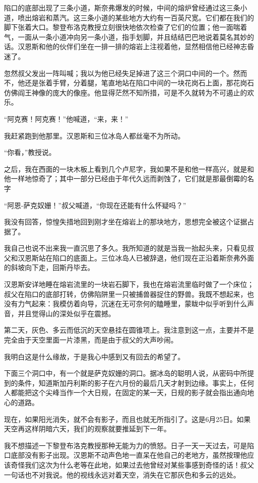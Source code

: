 \documentclass[10pt]{book}
\begin{document}
陷口的底部出现了三条小道，斯奈弗爆发的时候，中间的熔炉曾经通过这三条小道，喷出熔岩和蒸汽。这三条小道的某些地方大约有一百英尺宽。它们都在我们的脚下张着大口。黎登布洛克教授立刻很快地依次检查了它们的位置；他一面喘着气，一面从一条小道冲向另一条小道，指手划脚，并且结结巴巴地说着莫名其妙的话。汉恩斯和他的伙伴们坐在一排一排的熔岩上注视着他，显然相信他已经神志昏迷了。

忽然叔父发出一阵叫喊；我以为他已经失足掉进了这三个洞口中间的一个。然而不，他还是张着手臂，分着腿，笔直地站在陷口中间的一块花岗石上面，那花岗石仿佛阎王神像的庞大的像座。他显得茫然不知所措，可是不久就转为不可遏止的欢乐。

“阿克赛！阿克赛！”他喊道，“来，来！”

我赶紧跑到他那里。汉恩斯和三位冰岛人都丝毫不为所动。

“你看，”教授说。

之后，我在西面的一块木板上看到几个卢尼字，我如果不是和他一样高兴，就是和他一样地惊奇了；其中一部分已经由于年代久远而剥蚀了，它们就是那最倒霉的名字

“阿恩-萨克奴姗！”叔父喊道，“你现在还能有什么怀疑吗？”

我没有回答，惊惶失措地回到刚才坐在熔岩上的那块地方，思想完全被这个证据占据了。

我自己也说不出来我一直沉思了多久。我所知道的就是当我一抬起头来，只看见叔父和汉恩斯站在陷口的底面上。三位冰岛人已被辞退，他们现在正沿着斯奈弗外面的斜坡向下走，回斯丹毕去。

汉恩斯安详地睡在熔岩流里的一块岩石脚下，我也在熔岩流里临时做了一个床位；叔父在陷口的底部打转，仿佛陷阱里一只被捕兽器捉住的野兽。我既不想起来，也没有力气起来：我模仿着向导，沉迷在无可奈何的瞌睡里，蒙眬中似乎听到什么声音，并且觉得山的深处似乎在震撼。

第二天，灰色、多云而低沉的天空悬挂在圆锥项上。我注意到这一点，主要并不是完全由于天空里面一片漆黑，而是由于叔父的大声吵闹。

我明白这是什么缘故，于是我心中感到又有回去的希望了。

下面三个洞口中，有一个就是萨克奴姗的洞口。据冰岛的聪明人说，从密码中所提到的条件，知道斯加丹利斯的影子在六月份的最后几天才射到边缘。事实上，任何人都能把这个尖峰当作一个大日规，在固定的某一天，日规的影子就会指出通向地心的道路。

现在，如果阳光消失，就不会有影子，而且也就无所指引了。这是6月25日。如果天空再这样阴暗六天，我们的观察就要推延到下一年。

我不想描述一下黎登布洛克教授那种无能为力的愤怒。日子一天一天过去，可是陷口底部没有影子出现。汉恩斯不动声色地一直呆在他自己的老地方，虽然按理他应该奇怪我们这次为什么老等在此地，如果过去他曾经对某些事感到奇怪的话！叔父一句话也不对我说。他的视线永远对着天空，消失在它那灰色和多云的远处。
\end{document}
